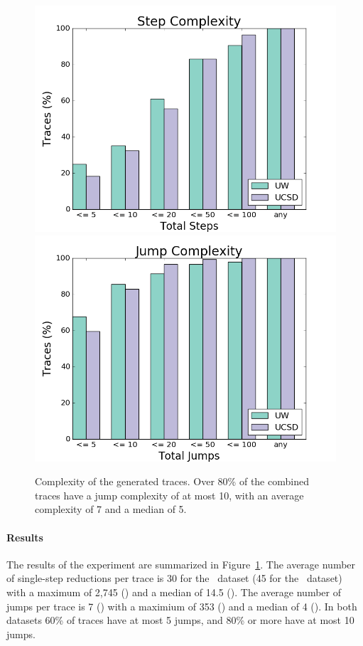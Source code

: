 %
\begin{figure}[t]
\includegraphics[width=0.7\linewidth]{trace_size_step.png}
\includegraphics[width=0.7\linewidth]{trace_size_jump.png}
\caption{Complexity of the generated traces. Over 80\% of the combined traces
  have a jump complexity of at most 10, with an average complexity of 7
  and a median of 5.}
\label{fig:results-complexity}
\end{figure}
%
\paragraph{Results}
\label{sec:results-complexity}
The results of the experiment are summarized in
Figure~\ref{fig:results-complexity}.
%
The average number of single-step reductions per trace is 30 for the
\ucsdbench\ dataset (45 for the \uwbench\ dataset) with a maximum of
2,745 () and a median of 14.5 ().
%
The average number of jumps per trace is 7 () with a
maximium of 353 () and a median of 4 ().
%
In both datasets 60\% of traces have at most 5 jumps, and 80\% or more
have at most 10 jumps.


